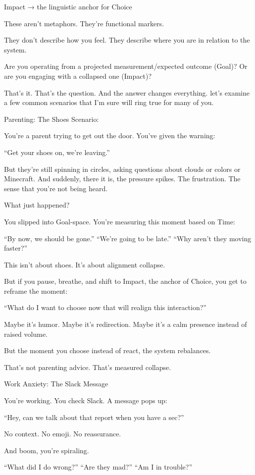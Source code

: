 \documentclass[12pt]{article}
\begin{document}
Impact → the linguistic anchor for Choice

These aren’t metaphors. They’re functional markers.

They don’t describe how you feel.
They describe where you are in relation to the system.

Are you operating from a projected measurement/expected outcome (Goal)? 
Or are you engaging with a collapsed one (Impact)?

That’s it. That’s the question.
And the answer changes everything.
let’s examine a few common scenarios that I’m sure will ring true for many of you. 

Parenting: The Shoes Scenario:

You’re a parent trying to get out the door. You’ve given the warning:

“Get your shoes on, we’re leaving.”

But they’re still spinning in circles, asking questions about clouds or colors or Minecraft. And suddenly, there it is, the pressure spikes. The frustration. The sense that you’re not being heard.

What just happened?

You slipped into Goal-space.
You’re measuring this moment based on Time:

“By now, we should be gone.”
“We’re going to be late.”
“Why aren’t they moving faster?”

This isn’t about shoes. It’s about alignment collapse.

But if you pause, breathe, and shift to Impact, the anchor of Choice, you get to reframe the moment:

“What do I want to choose now that will realign this interaction?”

Maybe it’s humor. Maybe it’s redirection. Maybe it’s a calm presence instead of raised volume.

But the moment you choose instead of react, the system rebalances.

That’s not parenting advice.
That’s measured collapse.

Work Anxiety: The Slack Message

You’re working. You check Slack. A message pops up:

“Hey, can we talk about that report when you have a sec?”

No context. No emoji. No reassurance.

And boom, you’re spiraling.

“What did I do wrong?”
“Are they mad?”
“Am I in trouble?”
\end{document}
